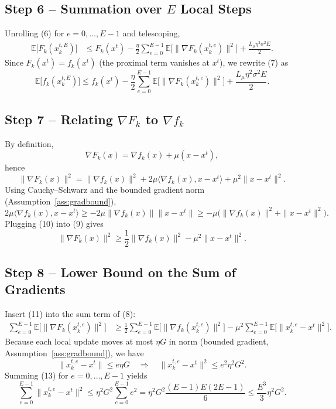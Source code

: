 \documentclass[11pt]{article}
\newcommand{\E}{\mathbb{E}}
\begin{document}
\subsection*{Step 6 – Summation over $E$ Local Steps}
Unrolling (6) for $e=0,\dots,E-1$ and telescoping,
\begin{align}
    \E\!\bigl[F_k(x_{k}^{t,E})\bigr]
    &\le F_k(x^{t})-\frac{\eta}{2}\sum_{e=0}^{E-1}\E\!\bigl[\|\nabla F_k(x_{k}^{t,e})\|^{2}\bigr]
      +\frac{L_{\mu}\eta^{2}\sigma^{2}E}{2}. \tag{7}
\end{align}
Since $F_k(x^{t})=f_k(x^{t})$ (the proximal term vanishes at $x^{t}$), we rewrite (7) as
\[
    \E\!\bigl[f_k(x_{k}^{t,E})\bigr]
    \le f_k(x^{t})
    -\frac{\eta}{2}\sum_{e=0}^{E-1}\E\!\bigl[\|\nabla F_k(x_{k}^{t,e})\|^{2}\bigr]
    +\frac{L_{\mu}\eta^{2}\sigma^{2}E}{2}. \tag{8}
\]

\subsection*{Step 7 – Relating $\nabla F_k$ to $\nabla f_k$}
By definition,
\[
    \nabla F_k(x)=\nabla f_k(x)+\mu(x-x^{t}),
\]
hence
\[
    \|\nabla F_k(x)\|^{2}
    =\|\nabla f_k(x)\|^{2}+2\mu\langle\nabla f_k(x),x-x^{t}\rangle+\mu^{2}\|x-x^{t}\|^{2}. \tag{9}
\]
Using Cauchy–Schwarz and the bounded gradient norm (Assumption~\ref{ass:gradbound}),
\[
    2\mu\langle\nabla f_k(x),x-x^{t}\rangle
    \ge -2\mu\|\nabla f_k(x)\|\|x-x^{t}\|
    \ge -\mu\bigl(\|\nabla f_k(x)\|^{2}+\|x-x^{t}\|^{2}\bigr). \tag{10}
\]
Plugging (10) into (9) gives
\[
    \|\nabla F_k(x)\|^{2}\ge
    \frac{1}{2}\|\nabla f_k(x)\|^{2}
    -\mu^{2}\|x-x^{t}\|^{2}. \tag{11}
\]

\subsection*{Step 8 – Lower Bound on the Sum of Gradients}
Insert (11) into the sum term of (8):
\begin{align}
    \sum_{e=0}^{E-1}\E\!\bigl[\|\nabla F_k(x_{k}^{t,e})\|^{2}\bigr]
    &\ge
      \frac{1}{2}\sum_{e=0}^{E-1}\E\!\bigl[\|\nabla f_k(x_{k}^{t,e})\|^{2}\bigr]
      -\mu^{2}\sum_{e=0}^{E-1}\E\!\bigl[\|x_{k}^{t,e}-x^{t}\|^{2}\bigr]. \tag{12}
\end{align}
Because each local update moves at most $\eta G$ in norm (bounded gradient, Assumption~\ref{ass:gradbound}), we have
\[
    \|x_{k}^{t,e}-x^{t}\|\le e\eta G\quad\Longrightarrow\quad
    \|x_{k}^{t,e}-x^{t}\|^{2}\le e^{2}\eta^{2}G^{2}. \tag{13}
\]
Summing (13) for $e=0,\dots,E-1$ yields
\[
    \sum_{e=0}^{E-1}\|x_{k}^{t,e}-x^{t}\|^{2}\le
    \eta^{2}G^{2}\sum_{e=0}^{E-1}e^{2}
    =\eta^{2}G^{2}\frac{(E-1)E(2E-1)}{6}
    \le \frac{E^{3}}{3}\eta^{2}G^{2}. \tag{14}
\]
\end{document}

